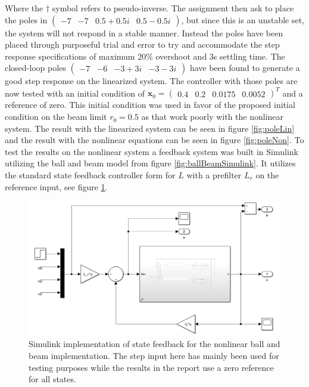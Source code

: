 \documentclass[a4paper, titlepage]{article}
\begin{document}
Where the $\dagger$ symbol refers to pseudo-inverse.
The assignment then ask to place the poles in $\begin{pmatrix} -7 & -7 & 0.5+0.5i & 0.5-0.5i \end{pmatrix}$, but since this is an unstable set, the system will not respond in a stable manner.
Instead the poles have been placed through purposeful trial and error to try and accommodate the step response specifications of maximum 20\% overshoot and 3s settling time.
The closed-loop poles $\begin{pmatrix} -7 & -6 & -3+3i & -3-3i \end{pmatrix}$ have been found to generate a good step response on the linearized system.
The controller with those poles are now tested with an initial condition of $\textbf{x}_0 = \begin{pmatrix} 0.4 & 0.2 & 0.0175 & 0.0052 \end{pmatrix}^T$ and a reference of zero.
This initial condition was used in favor of the proposed initial condition on the beam limit $r_0 = 0.5$ as that work poorly with the nonlinear system.
The result with the linearized system can be seen in figure \ref{fig:poleLin} and the result with the nonlinear equations can be seen in figure \ref{fig:poleNon}.
To test the results on the nonlinear system a feedback system was built in Simulink utilizing the ball and beam model from figure \ref{fig:ballBeamSimulink}.
It utilizes the standard state feedback controller form for $L$ with a prefilter $L_r$ on the reference input, see figure \ref{fig:feedbackSys}.

\begin{figure}[h!]
\center
\includegraphics[scale=0.4]{../figures/feedbackSystemSimulink.png}
\caption{Simulink implementation of state feedback for the nonlinear ball and beam implementation. The step input here has mainly been used for testing purposes while the results in the report use a zero reference for all states.}
\label{fig:feedbackSys}
\end{figure}
\end{document}
